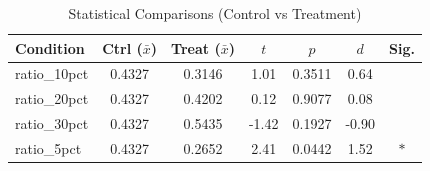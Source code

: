 \begin{table}[htbp]
\centering
\caption{Statistical Comparisons (Control vs Treatment)}
\label{tab:stats}
\begin{tabular}{lcccccc}
\toprule
Condition & Ctrl ($\bar{x}$) & Treat ($\bar{x}$) & $t$ & $p$ & $d$ & Sig. \\
\midrule
  ratio\_10pct & 0.4327 & 0.3146 & 1.01 & 0.3511 & 0.64 &  \\
  ratio\_20pct & 0.4327 & 0.4202 & 0.12 & 0.9077 & 0.08 &  \\
  ratio\_30pct & 0.4327 & 0.5435 & -1.42 & 0.1927 & -0.90 &  \\
  ratio\_5pct & 0.4327 & 0.2652 & 2.41 & 0.0442 & 1.52 & $*$ \\
\bottomrule
\end{tabular}
\end{table}
